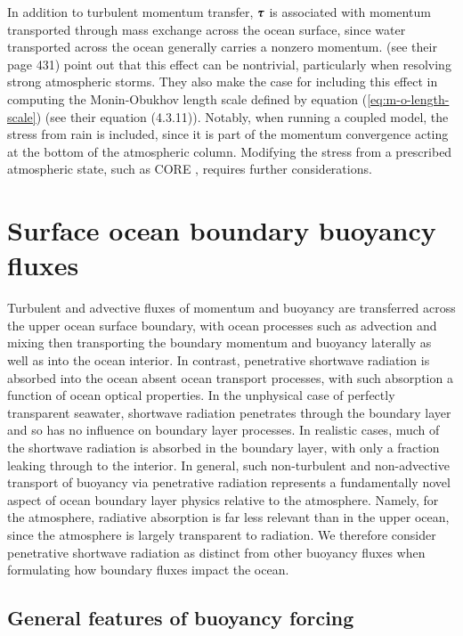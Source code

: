 In addition to turbulent momentum transfer, $\mbox{\boldmath $\tau$}$ is associated
with momentum transported through mass exchange across the ocean
surface, since water transported across the ocean generally carries a
nonzero momentum.  \cite{KanthaClaysonII} (see their page 431) point
out that this effect can be nontrivial, particularly when resolving
strong atmospheric storms. They also make the case for including this
effect in computing the Monin-Obukhov length scale defined by equation
(\ref{eq:m-o-length-scale}) (see their equation (4.3.11)).  Notably,
when running a coupled model, the stress from rain is included, since
it is part of the momentum convergence acting at the bottom of the
atmospheric column.  Modifying the stress from a prescribed
atmospheric state, such as CORE \citep{LargeYeager2009}, requires
further considerations.


\section{Surface ocean boundary buoyancy fluxes}
\label{section:boundary-forcing-buoyancy-kpp}

Turbulent and advective fluxes of momentum and buoyancy are
transferred across the upper ocean surface boundary, with ocean
processes such as advection and mixing then transporting the boundary
momentum and buoyancy laterally as well as into the ocean interior.
In contrast, penetrative shortwave radiation is absorbed into the
ocean absent ocean transport processes, with such absorption a
function of ocean optical properties.  In the unphysical case of
perfectly transparent seawater, shortwave radiation penetrates through
the boundary layer and so has no influence on boundary layer
processes.  In realistic cases, much of the shortwave radiation is
absorbed in the boundary layer, with only a fraction leaking through
to the interior. In general, such non-turbulent and non-advective
transport of buoyancy via penetrative radiation represents a
fundamentally novel aspect of ocean boundary layer physics relative to
the atmosphere.  Namely, for the atmosphere, radiative absorption is
far less relevant than in the upper ocean, since the atmosphere is
largely transparent to radiation.  We therefore consider penetrative
shortwave radiation as distinct from other buoyancy fluxes when
formulating how boundary fluxes impact the ocean.


\subsection{General features of buoyancy forcing}

